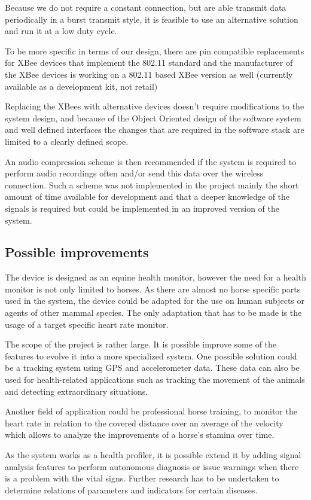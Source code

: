 Because we do not require a constant connection, but are able transmit data periodically in a burst transmit style, it is feasible to use an alternative solution and run it at a low duty cycle. 

To be more specific in terms of our design, there are pin compatible replacements for XBee devices that implement the 802.11 standard and the manufacturer of the XBee devices is working on a 802.11 based XBee version as well (currently available as a development kit, not retail)

Replacing the XBees with alternative devices doesn’t require modifications to the system design, and because of the Object Oriented design of the software system and well defined interfaces the changes that are required in the software stack are limited to a clearly defined scope.

An audio compression scheme is then recommended if the system is required to perform audio recordings often and/or send this data over the wireless connection. Such a scheme was not implemented in the project mainly the short amount of time available for development and that a deeper knowledge of the signals is required but could be implemented in an improved version of the system.

\subsection{Possible improvements}
The device is designed as an equine health monitor, however the need for a health monitor is not only limited to horses. As there are almost no horse specific parts used in the system, the device could be adapted for the use on human subjects or agents of other mammal species. The only adaptation that has to be made is the usage of a target specific heart rate monitor. 

The scope of the project is rather large. It is possible improve some of the features to evolve it into a more specialized system. One possible solution could be a tracking system using GPS and accelerometer data. These data can also be used for health-related applications such as tracking the movement of the animals and detecting extraordinary situations. 

Another field of application could be professional horse training, to monitor the heart rate in relation to the covered distance over an average of the velocity which allows to analyze the improvements of a horse’s stamina over time.

As the system works as a health profiler, it is possible extend it by adding signal analysis features to perform autonomous diagnosis or issue warnings when there is a problem with the vital signs. Further research has to be undertaken to determine relations of parameters and indicators for certain diseases.

